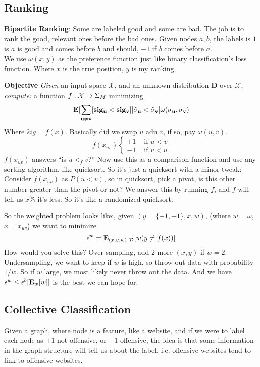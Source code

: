 \subsection{Ranking}
\label{sec:ranking}
\textbf{Bipartite Ranking}: Some are labeled good and some are
bad. The job is to rank the good, relevant ones before the bad
ones. Given nodes $a,b$, the labels is $1$ is $a$ is good and comes before $b$ and
should, $-1$ if $b$ comes before $a$.\\
We use $\omega(x,y)$ as the preference function just like binary classification's loss
function. Where $x$ is the true position, $y$ is my ranking.

\textbf{Objective}
\emph{Given} an input space $\mathcal{X}$, and an unknown distribution
$\mathbf{D}$ over $\mathcal{X}$, \emph{compute:} a function
$f:\mathcal{X}\rightarrow \Sigma_M$ minimizing $$\mathbf{E[\sum_{u\neq
    v}[sig_u<sig_v][\hat {\sigma}_u < \hat {\sigma}_v]\omega(\sigma_u,\sigma_v)}$$
Where $\hat sig = f(x)$. Basically did we swap $u$ adn $v$, if so, pay
$\omega(u,v)$.
$$f(x_{uv}) \begin{cases}
  +1& \text{ if } u<v\\
-1&\text{ if }v < u
\end{cases}$$
$f(x_{uv})$ answers ``is $u<_fv$?'' Now use this as a comparison
function and use any sorting algorithm, like quicksort. So it's just a
quicksort with a minor tweak:\\

Consider $f(x_{uv})$ as $P(u<v)$, so in quicksort, pick a pivot, is
this other number greater than the pivot or not? We answer this by
running $f$, and $f$ will tell us $x\%$ it's less. So it's like a
randomized quicksort.

So the weighted problem looks like:, given $(y=\{+1,-1\},x,w)$, (where
$w=\omega$, $x= x_{uv}$) we want to minimize
$$\epsilon^w = \mathbf{E}_{(x,y,w)~\mathcal{D}}[w(y\neq f(x))]$$
How would you solve this? Over sampling, add 2 more $(x,y)$ if
$w=2$. Undersampling, we want to keep if $w$ is high, so throw out
data with probability $1/w$. So if $w$ large, we most likely never
throw out the data. And we have $\epsilon^w \le \epsilon^b[\mathbf{E}_w[w]]$
is the best we can hope for.

\subsection{Collective Classification}
\label{sec:collectiveclassification}

Given a graph, where node is a feature, like a website, and if we were
to label each node as $+1$ not offensive, or $-1$ offensive, the idea
is that some information in the graph structure will tell us about the
label. i.e. offensive websites tend to link to offensive websites.

